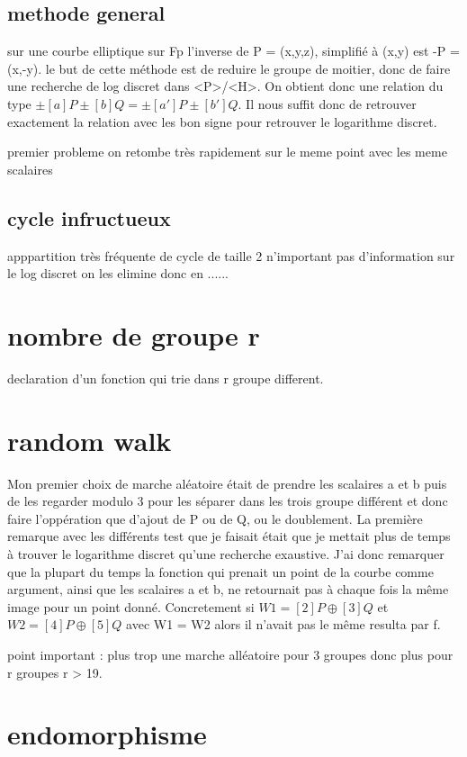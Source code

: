 \documentclass[a4paper,10pt]{report}
\begin{document}
{\section{methode general}
sur une courbe elliptique sur Fp l'inverse de P = (x,y,z), simplifié à (x,y) est -P = (x,-y). le but de cette méthode est de reduire le groupe de moitier,
donc de faire une recherche de log discret dans <P>/<H>. On obtient donc une relation du type $\pm[a]P \pm[b]Q = \pm[a']P \pm[b']Q$. Il nous suffit donc de retrouver exactement 
la relation avec les bon signe pour retrouver le logarithme discret.

premier probleme on retombe très rapidement sur le meme point avec les meme scalaires	

\section{cycle infructueux}
apppartition très fréquente de cycle de taille 2 n'important pas d'information sur le log discret on les elimine donc en ......

\chapter{nombre de groupe r}
declaration d'un fonction qui trie dans r groupe different.


\chapter{random walk}

Mon premier choix de marche aléatoire était de prendre les scalaires a et b puis de les regarder modulo 3 pour les séparer dans les 
trois groupe différent et donc faire l'oppération que d'ajout de P ou de Q, ou le doublement.
La première remarque avec les différents test que je faisait était que je mettait plus de temps à trouver le logarithme discret
qu'une recherche exaustive. J'ai donc remarquer que la plupart du temps la fonction qui prenait un point de la courbe comme argument,
ainsi que les scalaires a et b, ne retournait pas à chaque fois la même image pour un point donné. Concretement si 
$W1 = [2]P \oplus [3]Q$ et $W2 = [4]P \oplus [5]Q$ avec W1 = W2 alors il n'avait pas le même resulta par f.

point important : plus trop une marche alléatoire pour 3 groupes donc plus pour r groupes r > 19.

\chapter{endomorphisme}

}
\end{document}
